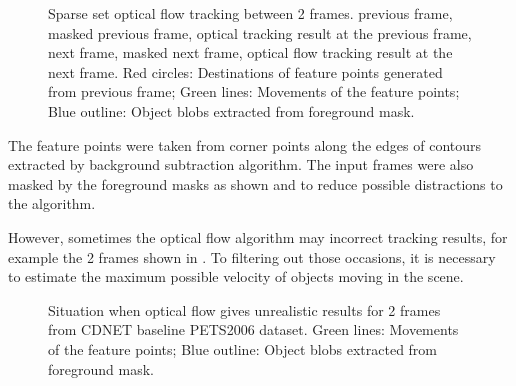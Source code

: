 \begin{figure}[htb]
  \centering
  \iffalse
  \subfigure [] {
    \texttt{[image: optical/between/prev\_mask2]}
    \label{imp:of:prev_mask}
  }
  \fi
  \caption{Sparse set optical flow tracking between 2 frames.  previous frame,  masked previous frame,  optical tracking result at the previous frame,  next frame,  masked next frame,  optical flow tracking result at the next frame. {\color{red}Red circles}: Destinations of feature points generated from previous frame; {\color{dkgreen}Green lines}: Movements of the feature points; {\color{blue}Blue outline}: Object blobs extracted from foreground mask.}
  \label{imp:of}
\end{figure}

The feature points were taken from corner points along the edges of contours extracted by background subtraction algorithm. The input frames were also masked by the foreground masks as shown   and  to reduce possible distractions to the algorithm.

However, sometimes the optical flow algorithm may  incorrect tracking results, for example the 2 frames shown in . To filtering out those occasions, it is necessary to estimate the maximum possible velocity of objects moving in the scene.

\begin{figure}[htb]
  \centering
  \caption{Situation when optical flow gives unrealistic results for 2 frames from CDNET baseline PETS2006 dataset. {\color{dkgreen}Green lines}: Movements of the feature points; {\color{blue}Blue outline}: Object blobs extracted from foreground mask.}
  \label{imp:of:error}
\end{figure}

